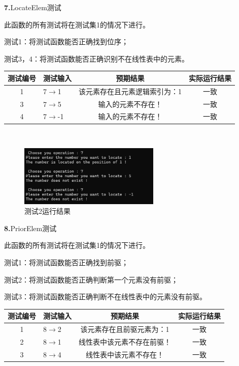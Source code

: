 \documentclass[supercite]{Experimental_Report}
\theoremstyle{definition}
\begin{document}
\noindent\textbf{ 7.}LocateElem测试

此函数的所有测试将在测试集1的情况下进行。

测试1：将测试函数能否正确找到位序；

测试3，4：将测试函数能否正确识别不在线性表中的元素。

\vspace{0.5em}

\begin{tabular}{|c|l|c|c|}
	\hline
	测试编号 & 测试输入 & 预期结果 & 实际运行结果 \\
	\hline
	1 & 7$\rightarrow$1 & 该元素存在且元素逻辑索引为：1 & 一致 \\
	\hline
	3 & 7$\rightarrow$5 & 输入的元素不存在！ & 一致 \\
	\hline
	4 & 7$\rightarrow$-1 & 输入的元素不存在！ & 一致 \\
	\hline
\end{tabular}

~\

 \begin{figure}[H]
 	\centering
 	\includegraphics[width=0.6\textwidth]{images/线性表测试7.png}
 	\caption{测试2运行结果}
 	\label{txlab}
 \end{figure}


\noindent\textbf{ 8.}PriorElem测试

    此函数的所有测试将在测试集1的情况下进行。

    测试1：将测试函数能否正确找到前驱；

    测试2：将测试函数能否正确判断第一个元素没有前驱；

    测试3：将测试函数能否正确判断不在线性表中的元素没有前驱。

\vspace{0.5em}

\begin{tabular}{|c|l|c|c|}
	\hline
	测试编号 & 测试输入 & 预期结果 & 实际运行结果 \\
	\hline
	1 & 8$\rightarrow$2 & 该元素存在且前驱元素为：1 & 一致 \\
	\hline
	2 & 8$\rightarrow$1 & 线性表中该元素不存在前驱！ & 一致 \\
	\hline
	3 & 8$\rightarrow$4 & 线性表中该元素不存在！ & 一致 \\
	\hline
\end{tabular}
\end{document}
